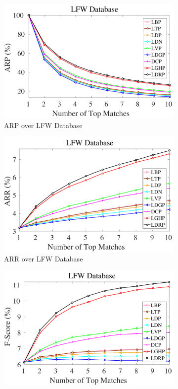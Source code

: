 \documentclass[a4paper]{article}
\begin{document}
\begin{figure}[!t]
  \begin{subfigure}{.25\textwidth}
    \centering
    \includegraphics[width=.98\linewidth]{lfw-arp}
    \caption{ARP over LFW Database}
    \label{fig:lfw-arp}
  \end{subfigure}%
    \begin{subfigure}{.25\textwidth}
    \centering
    \includegraphics[width=.98\linewidth]{lfw-arr}
    \caption{ARR over LFW Database}
    \label{fig:lfw-arr}
  \end{subfigure}
    \begin{subfigure}{.25\textwidth}
    \centering
    \includegraphics[width=.98\linewidth]{lfw-f}

\end{subfigure}
\end{figure}
\end{document}
